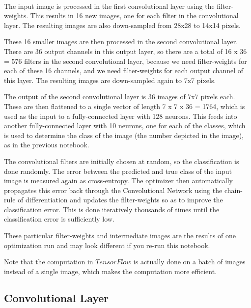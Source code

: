 \documentclass[11pt]{article}
\begin{document}
    \begin{center}
    \end{center}
    { \hspace*{\fill} \\}
    

    The input image is processed in the first convolutional layer using the
filter-weights. This results in 16 new images, one for each filter in
the convolutional layer. The resulting images are also down-sampled from
28x28 to 14x14 pixels.

These 16 smaller images are then processed in the second convolutional
layer. There are 36 output channels in this output layer, so there are a
total of 16 x 36 = 576 filters in the second convolutional layer,
because we need filter-weights for each of these 16 channels, and we
need filter-weights for each output channel of this layer. The resulting
images are down-sampled again to 7x7 pixels.

The output of the second convolutional layer is 36 images of 7x7 pixels
each. These are then flattened to a single vector of length 7 x 7 x 36 =
1764, which is used as the input to a fully-connected layer with 128
neurons. This feeds into another fully-connected layer with 10 neurons,
one for each of the classes, which is used to determine the class of the
image (the number depicted in the image), as in the previous notebook.

The convolutional filters are initially chosen at random, so the
classification is done randomly. The error between the predicted and
true class of the input image is measured again as cross-entropy. The
optimizer then automatically propagates this error back through the
Convolutional Network using the chain-rule of differentiation and
updates the filter-weights so as to improve the classification error.
This is done iteratively thousands of times until the classification
error is sufficiently low.

These particular filter-weights and intermediate images are the results
of one optimization run and may look different if you re-run this
notebook.

Note that the computation in \(TensorFlow\) is actually done on a batch
of images instead of a single image, which makes the computation more
efficient.

\subsection{Convolutional Layer}\label{convolutional-layer}
\end{document}
